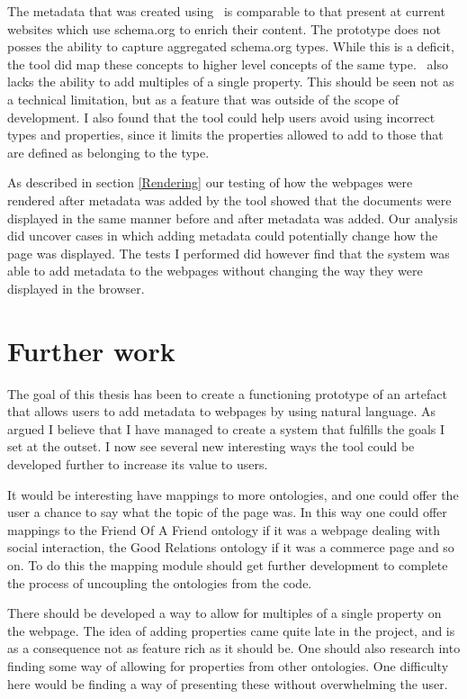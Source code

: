 The metadata that was created using \theartefact\ is comparable to that present at current websites which use schema.org to
enrich their content.
The prototype does not posses the ability to capture aggregated schema.org types.
While this is a deficit, the tool did map these concepts to higher level concepts of the same type.
\Theartefact\ also lacks the ability to add multiples of a single property.
This should be seen not as a technical limitation, but as a feature that was outside of the scope of development.
I also found that the tool could help users avoid using incorrect types and properties,
since it limits the properties allowed to add to those that are defined as belonging to the type.

As described in section \ref{Rendering} our testing of how the webpages were rendered after metadata was added by the tool
showed that the documents were displayed in the same manner before and after metadata was added.
Our analysis did uncover cases in which adding metadata could potentially change how the page was displayed.
The tests I performed did however find that the system was able to add metadata to the webpages without changing the way they were displayed in the browser.


\section{Further work}
The goal of this thesis has been to create a functioning prototype of an artefact that allows users to add metadata
to webpages by using natural language.
As argued I believe that I have managed to create a system that fulfills the goals I set at the outset.
I now see several new interesting ways the tool could be developed further to increase its value to users.

It would be interesting have mappings to more ontologies,
and one could offer the user a chance to say what the topic of the page was.
In this way one could offer mappings to the Friend Of A Friend ontology if it was a webpage dealing with
social interaction, the Good Relations ontology if it was a commerce page and so on.
To do this the mapping module should get further development to complete the process of uncoupling the ontologies
from the code.

There should be developed a way to allow for multiples of a single property on the webpage.
The idea of adding properties came quite late in the project,
and is as a consequence not as feature rich as it should be.
One should also research into finding some way of allowing for properties from other ontologies.
One difficulty here would be finding a way of presenting these without overwhelming the user.

